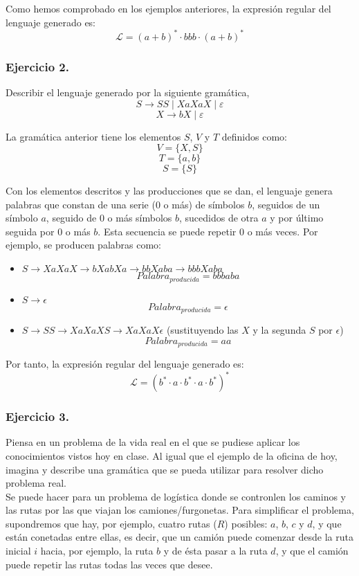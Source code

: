 \documentclass[11pt,a4paper]{article}
\begin{document}
Como hemos comprobado en los ejemplos anteriores, la expresión regular del lenguaje generado es:
	\[\mathcal{L}=(a+b)^{*}\cdot bbb\cdot (a+b)^{*}\]

\subsubsection{Ejercicio 2.} Describir el lenguaje generado por la siguiente gramática,\\
	\[S\rightarrow SS \mid XaXaX \mid \varepsilon \]
	\[X\rightarrow bX \mid \varepsilon\]
	
La gramática anterior tiene los elementos $S$, $V$ y $T$ definidos como:
	\[V=\{X,S\}\]
	\[T=\{a,b\}\]
	\[S=\{S\}\]
	
Con los elementos descritos y las producciones que se dan, el lenguaje genera palabras que constan de una serie (0 o más) de símbolos $b$, seguidos de un símbolo $a$, seguido de 0 o más símbolos $b$, sucedidos de otra $a$ y por último seguida por 0 o más $b$. Esta secuencia se puede repetir 0 o más veces. Por ejemplo, se producen palabras como:

	\begin{itemize}
	\item $S\rightarrow XaXaX\rightarrow bXabXa\rightarrow bbXaba\rightarrow bbbXaba$
	\[Palabra_{producida}=bbbaba\]
	\item $S\rightarrow \epsilon$
	\[Palabra_{producida}=\epsilon\]
	\item $S\rightarrow SS\rightarrow XaXaXS\rightarrow XaXaX\epsilon$ (sustituyendo las $X$ y la segunda $S$ por $\epsilon$)
	\[Palabra_{producida}=aa\]
	\end{itemize}
	
Por tanto, la expresión regular del lenguaje generado es:
	\[\mathcal{L}=(b^*\cdot a\cdot b^*\cdot a\cdot b^*)^*\]
	
\subsubsection{Ejercicio 3.} Piensa en un problema de la vida real en el que se pudiese aplicar los conocimientos vistos hoy en clase. Al igual que el ejemplo de la oficina de hoy, imagina y describe una gramática que se pueda utilizar para resolver dicho problema real.\\

Se puede hacer para un problema de logística donde se contronlen los caminos y las rutas por las que viajan los camiones/furgonetas. Para simplificar el problema, supondremos que hay, por ejemplo, cuatro rutas ($R$) posibles: $a$, $b$, $c$ y $d$, y que están conetadas entre ellas, es decir, que un camión puede comenzar desde la ruta inicial $i$ hacia, por ejemplo, la ruta $b$ y de ésta pasar a la ruta $d$, y que el camión puede repetir las rutas todas las veces que desee.\\
\end{document}
